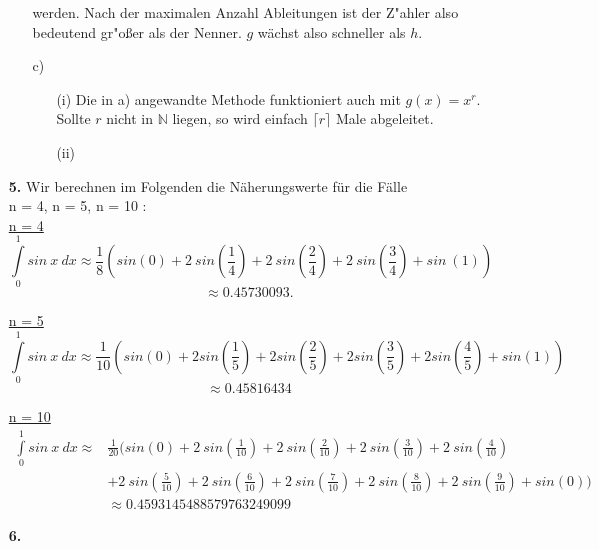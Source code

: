 \documentclass[a4paper,11pt]{article}
\begin{document}
\begin{enumerate}
\begin{enumerate}
                    werden. Nach der maximalen Anzahl Ableitungen ist der Z"ahler also bedeutend gr"oßer als der Nenner.
                    $g$ wächst also schneller als $h$.
                \item[c)]
                    \begin{enumerate}
                        \item[(i)]
                            Die in a) angewandte Methode funktioniert auch mit $g(x)=x^r$. Sollte $r$ nicht in $\mathbb{N}$ liegen, so wird einfach
                            $\lceil r \rceil$ Male abgeleitet.
                        \item[(ii)]
                            
                    \end{enumerate}
            \end{enumerate}

        \item[\textbf{5.}]
            Wir berechnen im Folgenden die Näherungswerte für die Fälle \\ n = 4, n = 5, n = 10 : \\[0.5cm]
            \underline{n = 4}
            $$ \int\limits_{0}^{1} sin \ x \ dx \approx \frac{1}{8}\left(sin(0) + 2 \ sin \left(\frac{1}{4}\right)+ 2 \ sin\left(\frac{2}{4}\right) + 2 \ sin\left(\frac{3}{4}\right)+ sin \ (1)\right)$$
            $$ \approx 0.45730093.$$ 

             \underline{n = 5}
            $$ \int\limits_{0}^{1} sin \ x \ dx \approx \frac{1}{10}\left(sin(0) +  2 sin\left(\frac{1}{5}\right) + 2sin\left(\frac{2}{5}\right) + 2 sin\left( \frac{3}{5}\right) + 2 sin\left( \frac{4}{5}\right) + sin(1)\right) $$
            $$ \approx 0.45816434 $$

            \underline{n = 10}
            \begin{align*}
            \int\limits_{0}^{1} sin \ x \ dx \approx &\frac{1}{20}\Bigg(sin(0) + 2 \ sin \left(\frac{1}{10}\right)+ 2 \ sin \left(\frac{2}{10}\right)+ 2 \ sin \left(\frac{3}{10}\right)+ 2 \ sin \left(\frac{4}{10}\right) \\ 
            &+ 2 \ sin \left(\frac{5}{10}\right)+ 2 \ sin \left(\frac{6}{10}\right)+ 2 \ sin \left(\frac{7}{10}\right)+ 2 \ sin \left(\frac{8}{10}\right)+ 2 \ sin \left(\frac{9}{10}\right)+  sin(0)\Bigg) \\[0.5cm]
            &\approx 0.4593145488579763249099
            \end{align*}
        \item[\textbf{6.}]
            \todo

    \end{enumerate}
\end{document}
